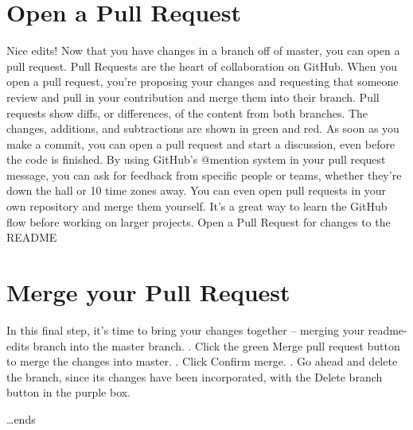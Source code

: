 \documentclass[11pt]{report}
\begin{document}
\chapter{Open a Pull Request}
Nice edits! Now that you have changes in a branch off of master, you can open a pull request.
\newline
\newline Pull Requests are the heart of collaboration on GitHub. When you open a pull request, you’re proposing your changes and requesting that someone review and pull in your contribution and merge them into their branch. Pull requests show diffs, or differences, of the content from both branches. The changes, additions, and subtractions are shown in green and red.
\newline
\newline As soon as you make a commit, you can open a pull request and start a discussion, even before the code is finished.
\newline
\newline By using GitHub’s @mention system in your pull request message, you can ask for feedback from specific people or teams, whether they’re down the hall or 10 time zones away.
\newline
\newline You can even open pull requests in your own repository and merge them yourself. It’s a great way to learn the GitHub flow before working on larger projects.
\newline
\newline Open a Pull Request for changes to the README

\chapter{Merge your Pull Request}
In this final step, it’s time to bring your changes together – merging your readme-edits branch into the master branch.
\newline
\newline
{}. Click the green Merge pull request button to merge the changes into master.
\newline
{}. Click Confirm merge.
\newline
{}. Go ahead and delete the branch, since its changes have been incorporated, with the Delete branch button in the purple box.

\ldots{}ends
\end{document}
